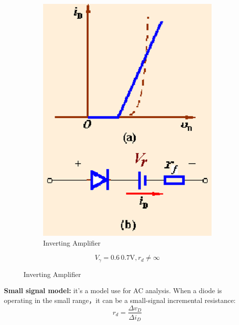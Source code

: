 \documentclass[a4paper,11pt,UTF8]{article}
\begin{document}
\begin{figure}[H]
	\begin{minipage}{.5\textwidth}
		\begin{figure}[H] 
			\centering 
			\includegraphics[scale=0.4]{./img/1.3}
			\caption{Inverting Amplifier}
		\end{figure}
	\end{minipage}
	\begin{minipage}{.5\textwidth}
		\LARGE{$$
			V_\gamma=0.6~0.7\mathrm{V}, r_d\neq\infty
			$$}
	\end{minipage}
\end{figure}
\textbf{Small signal model:} it's a model use for AC analysis. When a diode is operating in the small range，it can be a small-signal incremental resistance:
$$
	r_d=\frac{\Delta v_D}{\Delta i_D}
$$
\end{document}
